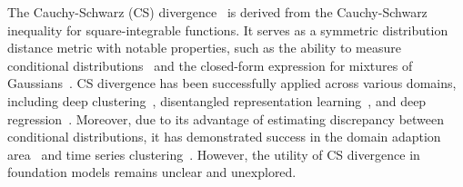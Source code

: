 







 The Cauchy-Schwarz (CS) divergence~\cite{principe2000information,principe2000learning} is derived from the Cauchy-Schwarz inequality for square-integrable functions. It serves as a symmetric distribution distance metric with notable properties, such as the ability to measure conditional distributions~\citep{yu2023conditional} and the closed-form expression for mixtures of Gaussians~\citep{kampa2011closed}.
CS divergence has been successfully applied across various domains, including deep clustering~\citep{trosten2021reconsidering}, disentangled representation learning~\citep{tran2022cauchy}, and deep regression~\citep{yu2024cauchy}. Moreover, due to its advantage of estimating discrepancy between conditional distributions, it has demonstrated success in the domain adaption area~\citep{yindomain} and time series clustering~\cite{yu2023conditional}. 
However, the utility of CS divergence in foundation models remains unclear and unexplored.


